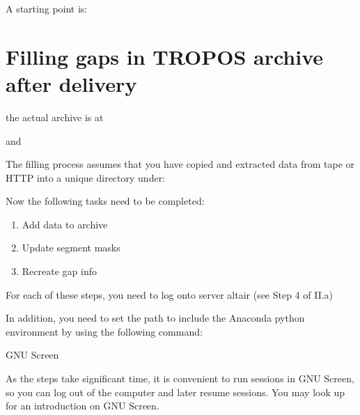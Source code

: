 \documentclass[letterpaper,10pt,english]{sphinxmanual}
\begin{document}
A starting point is:



\chapter{Filling gaps in TROPOS archive after delivery}
\label{\detokenize{filling_gaps:filling-gaps-in-tropos-archive-after-delivery}}\label{\detokenize{filling_gaps::doc}}
 the actual archive is at


and


The filling process assumes that you have copied and extracted data from
tape or HTTP into a unique directory under:


Now the following tasks need to be completed:
\begin{enumerate}
%
\item {} 
Add data to archive

\item {} 
Update segment masks

\item {} 
Re\sphinxhyphen{}create gap info

\end{enumerate}

For each of these steps, you need to log onto server altair (see Step 4
of II.a)

In addition, you need to set the path to include the Anaconda python
environment by using the following command:


 GNU Screen

As the steps take significant time, it is convenient to run sessions in
GNU Screen, so you can log out of the computer and later resume
sessions. You may look up
 for an introduction on GNU Screen.
\end{document}
